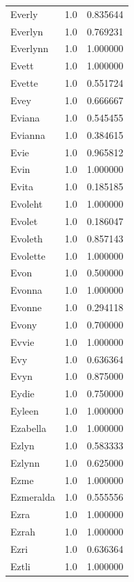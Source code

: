 \documentclass[
  letterpaper,
  DIV=11,
  numbers=noendperiod]{scrreprt}
\begin{document}
\begin{tabular}{lrr}
Everly          &   1.0 &   0.835644 \\
Everlyn         &   1.0 &   0.769231 \\
Everlynn        &   1.0 &   1.000000 \\
Evett           &   1.0 &   1.000000 \\
Evette          &   1.0 &   0.551724 \\
Evey            &   1.0 &   0.666667 \\
Eviana          &   1.0 &   0.545455 \\
Evianna         &   1.0 &   0.384615 \\
Evie            &   1.0 &   0.965812 \\
Evin            &   1.0 &   1.000000 \\
Evita           &   1.0 &   0.185185 \\
Evoleht         &   1.0 &   1.000000 \\
Evolet          &   1.0 &   0.186047 \\
Evoleth         &   1.0 &   0.857143 \\
Evolette        &   1.0 &   1.000000 \\
Evon            &   1.0 &   0.500000 \\
Evonna          &   1.0 &   1.000000 \\
Evonne          &   1.0 &   0.294118 \\
Evony           &   1.0 &   0.700000 \\
Evvie           &   1.0 &   1.000000 \\
Evy             &   1.0 &   0.636364 \\
Evyn            &   1.0 &   0.875000 \\
Eydie           &   1.0 &   0.750000 \\
Eyleen          &   1.0 &   1.000000 \\
Ezabella        &   1.0 &   1.000000 \\
Ezlyn           &   1.0 &   0.583333 \\
Ezlynn          &   1.0 &   0.625000 \\
Ezme            &   1.0 &   1.000000 \\
Ezmeralda       &   1.0 &   0.555556 \\
Ezra            &   1.0 &   1.000000 \\
Ezrah           &   1.0 &   1.000000 \\
Ezri            &   1.0 &   0.636364 \\
Eztli           &   1.0 &   1.000000 \\

\end{tabular}
\end{document}
